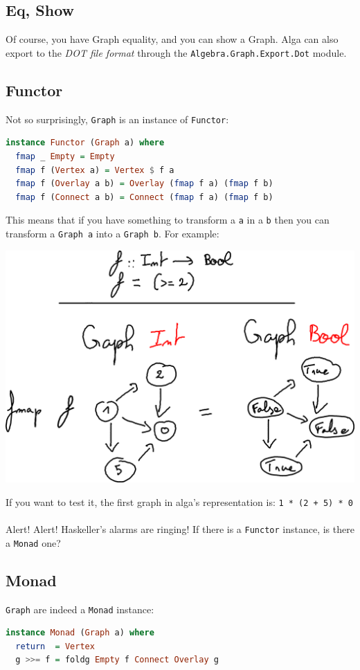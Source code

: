 \documentclass[10pt,a4paper]{article}
\begin{document}
\subsection{Eq, Show}
Of course, you have Graph equality, and you can show a Graph. Alga can also export to the \emph{DOT file format} through the \verb|Algebra.Graph.Export.Dot| module.

\subsection{Functor}
Not so surprisingly, \verb|Graph| is an instance of \verb|Functor|:
\begin{lstlisting}[language=Haskell, frame=single]
instance Functor (Graph a) where
  fmap _ Empty = Empty
  fmap f (Vertex a) = Vertex $ f a
  fmap f (Overlay a b) = Overlay (fmap f a) (fmap f b)
  fmap f (Connect a b) = Connect (fmap f a) (fmap f b)
\end{lstlisting}

This means that if you have something to transform a \verb|a| in a \verb|b| then you can transform a \verb|Graph a| into a \verb|Graph b|. For example:

\begin{center}
	\includegraphics[scale=0.5]{figspng/fmap.png}
\end{center}

If you want to test it, the first graph in alga's representation is: \verb|1 * (2 + 5) * 0|
\\
\\
Alert! Alert! Haskeller's alarms are ringing! If there is a \verb|Functor| instance, is there a \verb|Monad| one?

\subsection{Monad}
\verb|Graph| are indeed a \verb|Monad| instance:
\begin{lstlisting}[language=Haskell, frame=single]
instance Monad (Graph a) where
  return  = Vertex
  g >>= f = foldg Empty f Connect Overlay g
\end{lstlisting}
\end{document}
